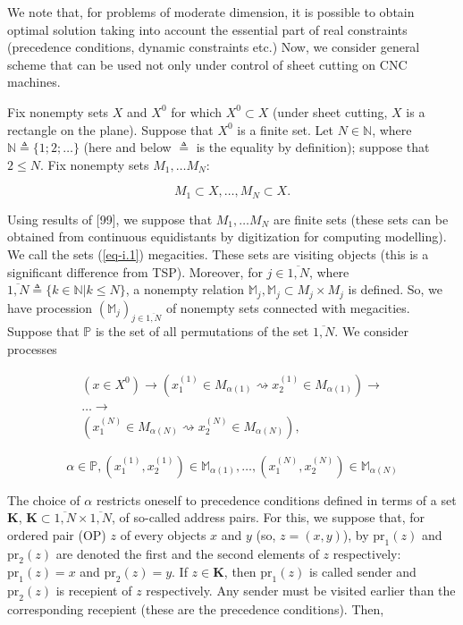 \documentclass{article}
\begin{document}
We note that,
for problems of moderate dimension,
it is possible to obtain optimal solution taking into account
the essential part of real constraints
(precedence conditions,
dynamic constraints etc.)
Now,
we consider general scheme that can be used not only
under control of sheet cutting on CNC machines.

Fix nonempty sets
$X$ and $X^0$
for which
$X^0 \subset X$
(under sheet cutting,
$X$ is a rectangle on the plane).
Suppose that
$X^0$ is a finite set.
Let
$N \in \mathbb N$,
where
$\mathbb N \triangleq \{1; 2; \dots \}$
(here and below
$\triangleq$
is the equality by definition);
suppose that
$2 \leqslant N$.
Fix nonempty sets
$M_1, \dots M_N$:

\begin{equation}
  \label{eq-i.1}
  M_1 \subset X,
  \dots ,
  M_N \subset X.
\end{equation}

Using results of
[99],  %
we suppose that
$M_1, \dots M_N$
are finite sets
(these sets can be obtained from
continuous equidistants by digitization
for computing modelling).
We call the sets
(\ref{eq-i.1})
megacities.
These sets are visiting objects
(this is a significant difference from TSP).
Moreover,
for
$j \in \overline{1, N}$,
where
$\overline{1,N} \triangleq \{k \in \mathbb N|k \leqslant N\}$,
a nonempty relation
$\mathbb M_j,
\mathbb M_j \subset M_j \times M_j$
is defined.
So, we have procession
$(\mathbb M_j)_{j \in \overline{1,N}}$
of nonempty sets connected with megacities.
Suppose that
$\mathbb P$
is the set of all permutations of the set
$\overline{1,N}$.
We consider processes

\begin{align*}
  (x\in X^0) \to
  (x_1^{(1)} \in M_{\alpha(1)} \rightsquigarrow x_2^{(1)} \in M_{\alpha(1)}) \to \\
  \dots \to \\
  (x_1^{(N)} \in M_{\alpha(N)} \rightsquigarrow x_2^{(N)} \in M_{\alpha(N)}),
\end{align*}

\begin{equation}
  \label{eq-i.2}
  \alpha \in \mathbb P,
  (x_1^{(1)}, x_2^{(1)}) \in \mathbb M_{\alpha(1)},
  \dots ,
  (x_1^{(N)}, x_2^{(N)}) \in \mathbb M_{\alpha(N)}
\end{equation}

The choice of
$\alpha$
restricts oneself to precedence conditions defined in terms of a set
$\mathbf K$,
$\mathbf K \subset \overline{1,N} \times \overline{1,N}$,
of so-called address pairs.
For this,
we suppose that,
for ordered pair (OP)
$z$
of every objects
$x$ and $y$
(so,
$z=(x,y)$),
by
$\mathrm{pr}_1(z)$
and
$\mathrm{pr}_2(z)$
are denoted the first and the second elements of
$z$
respectively:
$\mathrm{pr}_1(z)=x$
and
$\mathrm{pr}_2(z)=y$.
If
$z \in \mathbf K$,
then
$\mathrm{pr}_1(z)$
is called sender
and
$\mathrm{pr}_2(z)$
is recepient of
$z$
respectively.
Any sender must be visited earlier than
the corresponding recepient
(these are the precedence conditions).
Then,
\end{document}
